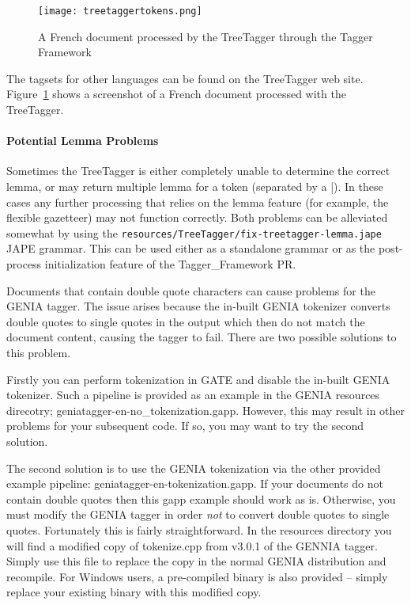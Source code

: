 \begin{figure}[htb]
  \centering
  \texttt{[image: treetaggertokens.png]}
  \caption{A French document processed by the TreeTagger through the Tagger Framework}
  \label{fig:treetagger}
\end{figure}

The tagsets for other languages can be found on the TreeTagger web
site. Figure~\ref{fig:treetagger} shows a screenshot of a French
document processed with the TreeTagger.

\paragraph{Potential Lemma Problems} Sometimes the TreeTagger is either
completely unable to determine the correct lemma, or may return multiple
lemma for a token (separated by a |). In these cases any further processing
that relies on the lemma feature (for example, the flexible gazetteer) may
not function correctly. Both problems can be alleviated somewhat by using
the \verb|resources/TreeTagger/fix-treetagger-lemma.jape| JAPE grammar.
This can be used either as a standalone grammar or as the post-process
initialization feature of the Tagger\_Framework PR.

Documents that contain double quote characters can cause problems for 
the GENIA tagger. The issue arises because the in-built GENIA tokenizer
converts double quotes to single quotes in the output which then do not
match the document content, causing the tagger to fail. There are two possible
solutions to this problem.

Firstly you can perform tokenization in GATE and disable the in-built 
GENIA tokenizer. Such a pipeline is provided as an example in the GENIA
resources direcotry; geniatagger-en-no\_tokenization.gapp. However, this may
result in other problems for your subsequent code. If so, you may want to
try the second solution. 

The second solution is to use the GENIA tokenization via the other provided
example pipeline: geniatagger-en-tokenization.gapp. If your documents do not
contain double quotes then this gapp example should work as is. Otherwise,
you must modify the GENIA tagger in order \textit{not} to convert double quotes
to single quotes. Fortunately this is fairly straightforward. In the
resources directory you will find a modified copy of tokenize.cpp from
v3.0.1 of the GENNIA tagger. Simply use this file to replace the copy in the
normal GENIA distribution and recompile. For Windows users, a pre-compiled
binary is also provided -- simply replace your existing binary with this
modified copy.

